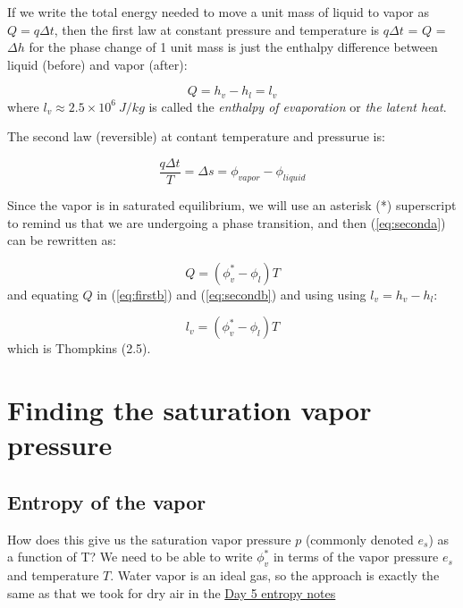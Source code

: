 \documentclass[12pt]{article}
\begin{document}
If we write the total energy needed to move a unit mass 
of liquid to vapor as $Q=q \Delta t$, then the
first law at constant pressure and temperature
is $q \Delta t$ = $Q$ = $\Delta h$ 
for the phase change of 1 unit mass is just the enthalpy
difference between liquid (before) and vapor (after):

\begin{equation}
  \label{eq:firstb}
  Q = h_v - h_l = l_v
\end{equation}
where $l_v \approx 2.5 \times 10^6\ J/kg$ is called the \textit{enthalpy of evaporation} or \textit{the latent heat}.

The second law (reversible) at contant temperature and pressurue
is:

\begin{equation}
  \label{eq:seconda}
  \frac{ q \Delta t}{T} = \Delta s = \phi_{vapor} - \phi_{liquid}
\end{equation}

Since the vapor is in saturated equilibrium, we will use 
an asterisk (*) superscript to remind us that we are
undergoing a phase transition, and then (\ref{eq:seconda})
can be rewritten as:

\begin{equation}
  \label{eq:secondb}
  Q  = (\phi_v^* - \phi_l ) T
\end{equation}
and equating $Q$ in (\ref{eq:firstb}) and (\ref{eq:secondb})
and using using $l_v = h_v - h_l$:

\begin{equation}
  \label{eq:secondd}
   l_v  =  (\phi_v^* - \phi_l) T
\end{equation}
which is Thompkins (2.5).


\section{Finding the saturation vapor pressure}
\label{sec:find-vapor-press}

\subsection{Entropy of the vapor}
\label{sec:entropy-vapor}


How does this give us the saturation vapor pressure $p$  (commonly denoted $e_s$) as a function of T?  We need to be able
to write $\phi_v^*$ in terms  of the vapor pressure $e_s$ and temperature $T$.   Water vapor is an ideal gas, so the
approach is exactly the same as that we took for dry air in the 
\href{https://www.dropbox.com/scl/fi/iknh9dm4iu1tfssa4724j/entropy.pdf?rlkey=buxyohh3w52ou6vk774s3xexq&dl=0}%
{Day 5 entropy notes}
\end{document}
